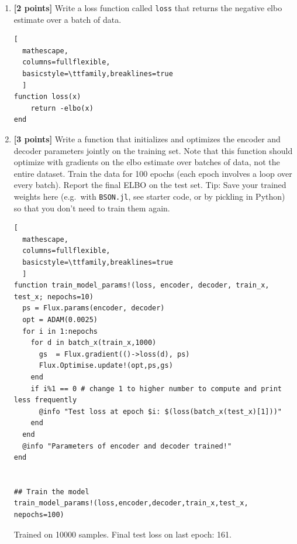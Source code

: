 \documentclass{article}
\begin{document}
\begin{enumerate}[label=(\alph*)]
\begin{lstlisting}[
  mathescape,
  columns=fullflexible,
  basicstyle=\ttfamily,breaklines=true
  ]
function elbo(x)
    (q_$\mu$, q_log$\sigma$) = encoder(x)
    z = sample_diag_gaussian(q_$\mu$, q_log$\sigma$)
    likelihoods = log_likelihood(x,z)
    negative_kl = 1/2 * sum(1 .+ 2 .* q_log$\sigma$ .-
                               q_$\mu$ .* q_$\mu$ .-
                               exp.(2 .* q_log$\sigma$), dims=1)
    mean(negative_kl + likelihoods, dims=2)[1]
end
\end{lstlisting}
  
	\item {\bf [2 points]} Write a loss function called \texttt{loss}
          that returns the negative elbo estimate over a batch of data.

\begin{lstlisting}[
  mathescape,
  columns=fullflexible,
  basicstyle=\ttfamily,breaklines=true
  ]
function loss(x)
    return -elbo(x)
end
\end{lstlisting}
\pagebreak
\item {\bf [3 points]} Write a function that initializes and optimizes the encoder and decoder parameters jointly on the training set. 
    Note that this function should optimize with gradients on the elbo estimate over batches of data, not the entire dataset.
    Train the data for 100 epochs (each epoch involves a loop over every batch).
    Report the final ELBO on the test set.
    Tip: Save your trained weights here (e.g.\ with \texttt{BSON.jl}, see starter code, or by pickling in Python) so that you don't need to train them again.

\begin{lstlisting}[
  mathescape,
  columns=fullflexible,
  basicstyle=\ttfamily,breaklines=true
  ]
function train_model_params!(loss, encoder, decoder, train_x, test_x; nepochs=10)
  ps = Flux.params(encoder, decoder)
  opt = ADAM(0.0025)
  for i in 1:nepochs
    for d in batch_x(train_x,1000)
      gs  = Flux.gradient(()->loss(d), ps)
      Flux.Optimise.update!(opt,ps,gs)
    end
    if i%1 == 0 # change 1 to higher number to compute and print less frequently
      @info "Test loss at epoch $i: $(loss(batch_x(test_x)[1]))"
    end
  end
  @info "Parameters of encoder and decoder trained!"
end


## Train the model
train_model_params!(loss,encoder,decoder,train_x,test_x, nepochs=100)
\end{lstlisting}

Trained on 10000 samples. Final test loss on last epoch: 161.

\end{enumerate}
\end{document}
